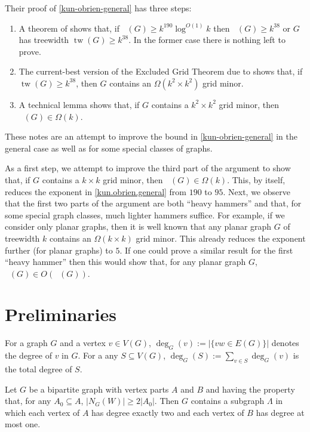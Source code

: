 \documentclass{patmorin}
\DeclareMathOperator{\tw}{tw}
\DeclareMathOperator{\chicen}{\chi_{\mathrm{cen}}}
\DeclareMathOperator{\chilin}{\chi_{\mathrm{lin}}}
\begin{document}
  
Their proof of \cref{kun-obrien-general} has three steps:
\begin{enumerate}
  \item A theorem of \citet{kawarabayashi.rossman:polynomial} shows that, if $\chicen(G)\ge k^{190}\log^{O(1)} k$ then $\chilin(G)\ge k^{38}$ or $G$ has treewidth $\tw(G)\ge k^{38}$.  In the former case there is nothing left to prove.
  \item The current-best version of the Excluded Grid Theorem due to \citet{chuzhoy:improved} shows that, if $\tw(G)\ge k^{38}$, then $G$ contains an $\Omega(k^2\times k^2)$ grid minor.
  \item A technical lemma \cite[Lemma~5]{kun.obrien.ea:polynomial} shows that, if $G$ contains a $k^2\times k^2$ grid minor, then $\chilin(G)\in\Omega(k)$.
\end{enumerate}

These notes are an attempt to improve the bound in \cref{kun-obrien-general} in the general case as well as for some special classes of graphs.  

As a first step, we attempt to improve the third part of the argument to show that, if $G$ contains a $k\times k$ grid minor, then $\chilin(G)\in \Omega(k)$.  This, by itself, reduces the exponent in \cref{kun.obrien.general} from $190$ to $95$.  Next, we observe that the first two parts of the argument are both ``heavy hammers'' and that, for some special graph classes, much lighter hammers suffice.  For example, if we consider only planar graphs, then it is well known that any planar graph $G$ of treewidth $k$ contains an $\Omega(k\times k)$ grid minor.  This already reduces the exponent further (for planar graphs) to $5$.  If one could prove a similar result for the first ``heavy hammer'' then this would show that, for any planar graph $G$, $\chicen(G)\in O(\chilin(G))$.


\section{Preliminaries}

For a graph $G$ and a vertex $v\in V(G)$, $\deg_G(v):=|\{vw\in E(G)\}|$ denotes the degree of $v$ in $G$.  For a any $S\subseteq V(G)$, $\deg_G(S):=\sum_{v\in S}\deg_G(v)$ is the total degree of $S$.

\begin{lem}\label{hall_vees}
  Let $G$ be a bipartite graph with vertex parts $A$ and $B$ and having the property that, for any $A_0\subseteq A$, $|N_G(W)|\ge 2|A_0|$.  Then $G$ contains a subgraph $\Lambda$ in which each vertex of $A$ has degree exactly two and each vertex of $B$ has degree at most one.
\end{lem}
\end{document}

